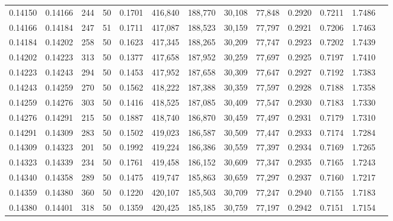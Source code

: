 \begin{tabular}{rrrrrrrrrrrrr}
0.14150 & 0.14166 &   244 &  50 &                                     0.1701 & 416,840 & 188,770 &  30,108 &  77,848 & 0.2920 & 0.7211 & 1.7486 \\
0.14166 & 0.14184 &   247 &  51 &                                     0.1711 & 417,087 & 188,523 &  30,159 &  77,797 & 0.2921 & 0.7206 & 1.7463 \\
0.14184 & 0.14202 &   258 &  50 &                                     0.1623 & 417,345 & 188,265 &  30,209 &  77,747 & 0.2923 & 0.7202 & 1.7439 \\
0.14202 & 0.14223 &   313 &  50 &                                     0.1377 & 417,658 & 187,952 &  30,259 &  77,697 & 0.2925 & 0.7197 & 1.7410 \\
0.14223 & 0.14243 &   294 &  50 &                                     0.1453 & 417,952 & 187,658 &  30,309 &  77,647 & 0.2927 & 0.7192 & 1.7383 \\
0.14243 & 0.14259 &   270 &  50 &                                     0.1562 & 418,222 & 187,388 &  30,359 &  77,597 & 0.2928 & 0.7188 & 1.7358 \\
0.14259 & 0.14276 &   303 &  50 &                                     0.1416 & 418,525 & 187,085 &  30,409 &  77,547 & 0.2930 & 0.7183 & 1.7330 \\
0.14276 & 0.14291 &   215 &  50 &                                     0.1887 & 418,740 & 186,870 &  30,459 &  77,497 & 0.2931 & 0.7179 & 1.7310 \\
0.14291 & 0.14309 &   283 &  50 &                                     0.1502 & 419,023 & 186,587 &  30,509 &  77,447 & 0.2933 & 0.7174 & 1.7284 \\
0.14309 & 0.14323 &   201 &  50 &                                     0.1992 & 419,224 & 186,386 &  30,559 &  77,397 & 0.2934 & 0.7169 & 1.7265 \\
0.14323 & 0.14339 &   234 &  50 &                                     0.1761 & 419,458 & 186,152 &  30,609 &  77,347 & 0.2935 & 0.7165 & 1.7243 \\
0.14340 & 0.14358 &   289 &  50 &                                     0.1475 & 419,747 & 185,863 &  30,659 &  77,297 & 0.2937 & 0.7160 & 1.7217 \\
0.14359 & 0.14380 &   360 &  50 &                                     0.1220 & 420,107 & 185,503 &  30,709 &  77,247 & 0.2940 & 0.7155 & 1.7183 \\
0.14380 & 0.14401 &   318 &  50 &                                     0.1359 & 420,425 & 185,185 &  30,759 &  77,197 & 0.2942 & 0.7151 & 1.7154 \\

\end{tabular}
